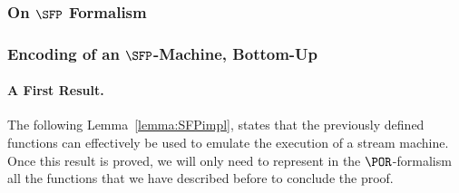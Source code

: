 

\subsubsection{On $\SFP$ Formalism}\label{sec:SFP}













\subsubsection{Encoding of an $\SFP$-Machine, Bottom-Up}\label{sec:SFP2}







\paragraph{A First Result.}
The following Lemma~\ref{lemma:SFPimpl},
states that the previously defined functions
can effectively be used to emulate the execution
of a stream machine.
Once this result is proved,
we will only need to represent in the
$\POR$-formalism
all the functions that we have described before
to conclude the proof.


